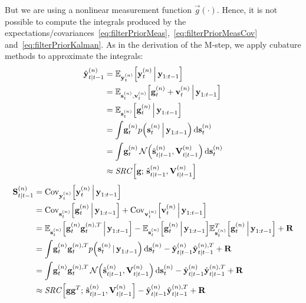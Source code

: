 		But we are using a nonlinear measurement function \( \vec{g}(\cdot) \). Hence, it is not possible to compute the integrals produced by the expectations/covariances~\eqref{eq:filterPriorMeas},~\eqref{eq:filterPriorMeasCov} and~\eqref{eq:filterPriorKalman}. As in the derivation of the M-step, we apply cubature methods to approximate the integrals:
		\begin{align}
			\hat{\boldsymbol{\mathrm{y}}}_{t \vert t - 1}^{(n)}
				&= \mathbb{E}_{\boldsymbol{\mathrm{y}}_t^{(n)}}\Big[\boldsymbol{\mathrm{y}}_t^{(n)} \,\Big\vert\, \boldsymbol{\mathrm{y}}_{1:t - 1}\Big]  \nonumber \\
				&= \mathbb{E}_{\boldsymbol{\mathrm{s}}_t^{(n)}, \boldsymbol{\mathrm{v}}_t^{(n)}}\Big[\boldsymbol{\mathrm{g}}_t^{(n)} + \boldsymbol{\mathrm{v}}_t^{(n)} \,\Big\vert\, \boldsymbol{\mathrm{y}}_{1:t - 1}\Big]  \nonumber \\
				&= \mathbb{E}_{\boldsymbol{\mathrm{s}}_t^{(n)}}\Big[\boldsymbol{\mathrm{g}}_t^{(n)} \,\Big\vert\, \boldsymbol{\mathrm{y}}_{1:t - 1}\Big]  \nonumber \\
				&= \int\! \boldsymbol{\mathrm{g}}_t^{(n)} p\Big(\boldsymbol{\mathrm{s}}_t^{(n)} \,\Big\vert\, \boldsymbol{\mathrm{y}}_{1:t - 1}\Big) \dd{\boldsymbol{\mathrm{s}}_t^{(n)}}  \nonumber \\
				&= \int\! \boldsymbol{\mathrm{g}}_t^{(n)} \,\mathcal{N}\Big(\hat{\boldsymbol{\mathrm{s}}}_{t \vert t - 1}^{(n)}, \boldsymbol{\mathrm{V}}_{t \vert t - 1}^{(n)}\Big) \dd{\boldsymbol{\mathrm{s}}_t^{(n)}}  \nonumber \\
				&\approx \mathit{SRC}\Big[ \boldsymbol{\mathrm{g}};\, \hat{\boldsymbol{\mathrm{s}}}_{t \vert t - 1}^{(n)}, \boldsymbol{\mathrm{V}}_{t \vert t - 1}^{(n)} \Big]  \label{eq:cubatureY}
		\end{align}
		\begin{align}
			\boldsymbol{\mathrm{S}}_{t \vert t - 1}^{(n)}
				&= \operatorname{Cov}_{\boldsymbol{\mathrm{y}}_t^{(n)}}\!\Big[\boldsymbol{\mathrm{y}}_t^{(n)} \,\Big\vert\, \boldsymbol{\mathrm{y}}_{1:t - 1}\Big]  \nonumber \\
				&= \operatorname{Cov}_{\boldsymbol{\mathrm{s}}_t^{(n)}}\!\Big[\boldsymbol{\mathrm{g}}_t^{(n)} \,\Big\vert\, \boldsymbol{\mathrm{y}}_{1:t - 1}\Big] + \operatorname{Cov}_{\boldsymbol{\mathrm{v}}_t^{(n)}}\!\Big[\boldsymbol{\mathrm{v}}_t^{(n)} \,\Big\vert\, \boldsymbol{\mathrm{y}}_{1:t - 1}\Big]  \nonumber \\
				&= \mathbb{E}_{\boldsymbol{\mathrm{s}}_t^{(n)}}\Big[\boldsymbol{\mathrm{g}}_t^{(n)} \boldsymbol{\mathrm{g}}_t^{(n), T} \,\Big\vert\, \boldsymbol{\mathrm{y}}_{1:t - 1}\Big] - \mathbb{E}_{\boldsymbol{\mathrm{s}}_t^{(n)}}\Big[\boldsymbol{\mathrm{g}}_t^{(n)} \,\Big\vert\, \boldsymbol{\mathrm{y}}_{1:t - 1}\Big] \mathbb{E}_{\boldsymbol{\mathrm{s}}_t^{(n)}}^T\Big[\boldsymbol{\mathrm{g}}_t^{(n)} \,\Big\vert\, \boldsymbol{\mathrm{y}}_{1:t - 1}\Big] + \boldsymbol{\mathrm{R}}  \nonumber \\
				&= \int\! \boldsymbol{\mathrm{g}}_t^{(n)} \boldsymbol{\mathrm{g}}_t^{(n), T} p\Big(\boldsymbol{\mathrm{s}}_t^{(n)} \,\vert\, \boldsymbol{\mathrm{y}}_{1:t - 1}\Big) \dd{\boldsymbol{\mathrm{s}}_t^{(n)}} - \hat{\boldsymbol{\mathrm{y}}}_{t \vert t - 1}^{(n)} \hat{\boldsymbol{\mathrm{y}}}_{t \vert t - 1}^{(n), T} + \boldsymbol{\mathrm{R}}  \nonumber \\
				&= \int\! \boldsymbol{\mathrm{g}}_t^{(n)} \boldsymbol{\mathrm{g}}_t^{(n), T} \,\mathcal{N}\Big(\hat{\boldsymbol{\mathrm{s}}}_{t \vert t - 1}^{(n)}, \boldsymbol{\mathrm{V}}_{t \vert t - 1}^{(n)}\Big) \dd{\boldsymbol{\mathrm{s}}_t^{(n)}} - \hat{\boldsymbol{\mathrm{y}}}_{t \vert t - 1}^{(n)} \hat{\boldsymbol{\mathrm{y}}}_{t \vert t - 1}^{(n), T} + \boldsymbol{\mathrm{R}}  \nonumber \\
				&\approx \mathit{SRC}\Big[ \boldsymbol{\mathrm{g}} \boldsymbol{\mathrm{g}}^T;\, \hat{\boldsymbol{\mathrm{s}}}_{t \vert t - 1}^{(n)}, \boldsymbol{\mathrm{V}}_{t \vert t - 1}^{(n)} \Big] - \hat{\boldsymbol{\mathrm{y}}}_{t \vert t - 1}^{(n)} \hat{\boldsymbol{\mathrm{y}}}_{t \vert t - 1}^{(n), T} + \boldsymbol{\mathrm{R}}  \label{eq:cubatureS}
		\end{align}
